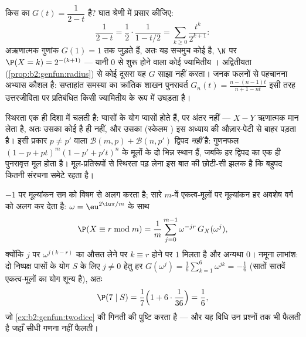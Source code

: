 \begin{example}\label{ex:b2:genfun:identify}
किस  का $G(t) = \dfrac1{2 - t}$ है? घात श्रेणी में प्रसार कीजिए:
\[
\frac{1}{2 - t} = \frac12\cdot\frac1{1 - t/2}
= \sum_{k\geq0}\frac{t^k}{2^{k+1}} :
\]
अऋणात्मक गुणांक $G(1) = 1$ तक जुड़ते हैं, अतः यह सचमुच कोई  है, $\N$
पर $\P(X = k) = 2^{-(k+1)}$ --- यानी $0$ से शुरू होने वाला कोई ज्यामितीय ।
अद्वितीयता (\cref{prop:b2:genfun:radius}) से कोई दूसरा  यह $G$ साझा नहीं करता। जनक
फलनों से  पहचानना अभ्यास  कौशल है: सप्ताहांत समस्या का
क्रांतिक शाखन पुनरावर्त $G_n(t) = \frac{n - (n-1)t}{n+1 - nt}$ इसी तरह उत्तरजीविता पर प्रतिबंधित
किसी ज्यामितीय  के रूप में उघड़ता है।
\end{example}

\begin{remark}
स्थिरता एक ही दिशा में चलती है:  प्वासों के योग प्वासों
होते हैं, पर अंतर नहीं --- $X - Y$ ऋणात्मक मान लेता है, अतः उसका कोई
 है ही नहीं, और उसका  (स्केलम ) इस अध्याय की
औज़ार-पेटी से बाहर पड़ता है। इसी प्रकार $p \neq p'$ वाला $\mathcal B(m, p) + \mathcal B(n, p')$ द्विपद
\emph{नहीं} है: गुणनफल $(1 - p +
pt)^m(1 - p' + p't)^n$ के मूलों के दो भिन्न स्थान हैं, जबकि हर
द्विपद  का एक ही पुनरावृत्त मूल होता है। मूल-प्रतिरूपों से
स्थिरता पढ़ लेना इस बात की छोटी-सी झलक है कि बहुपद कितनी संरचना
समेटे रहता है।
\end{remark}

\begin{remark}
$-1$ पर मूल्यांकन सम को विषम से अलग करता है; सारे $m$-वें एकत्व-मूलों
पर मूल्यांकन हर अवशेष वर्ग को अलग कर देता है: $\omega = \eu^{2\iu\pi/m}$ के साथ
\[
\P(X \equiv r \bmod m)
= \frac1m\sum_{j=0}^{m-1}\omega^{-jr}\,G_X(\omega^j),
\]
क्योंकि $j$ पर $\omega^{j(k-r)}$ का औसत लेने पर $k
\equiv r$ होने पर $1$ मिलता है और
अन्यथा $0$। नमूना लाभांश: दो निष्पक्ष पासों के योग $S$ के लिए $j \neq 0$
हेतु हर $G(\omega^j) = \frac16\sum_{k=1}^6
\omega^{jk} = -\frac16$ (सातों सातवें एकत्व-मूलों का योग शून्य है), अतः
\[
\P(7 \mid S) = \frac17\Bigl(1 +
6\cdot\frac1{36}\Bigr) = \frac16 ,
\]
जो \cref{ex:b2:genfun:twodice} की गिनती की पुष्टि करता है --- और यह विधि उन प्रश्नों तक
भी फैलती है जहाँ सीधी गणना नहीं फैलती।
\end{remark}

